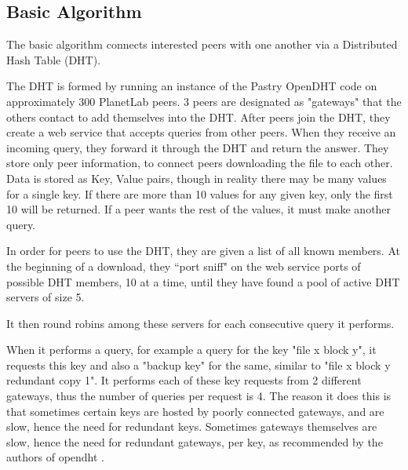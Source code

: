\subsection{Basic Algorithm}

The basic algorithm connects interested peers with one another via a Distributed Hash Table (DHT).

The DHT is formed by running an instance of the Pastry OpenDHT code on approximately 300 PlanetLab peers.  3 peers are designated as "gateways" that the others
contact to add themselves into the DHT.  After peers join the DHT, they create a web service that accepts queries from other peers.  When they receive an
incoming query, they forward it through the DHT and return the answer. They store only peer information, to connect peers downloading the file to each other.
Data is stored as Key, Value pairs, though in reality there may be many values for a single key.  If there are more than 10 values for any given
key, only the first 10 will be returned. If a peer wants the rest of the values, it must make another query.

In order for peers to use the DHT, they are given a list of all known members.  At the beginning of a download, they ``port sniff" on the web service ports of
possible DHT members, 10 at a time, until they have found a pool of active DHT servers  of size 5.

It then round robins among these servers for each consecutive query it performs.

When it performs a query, for example a query for the key "file x block y", it requests this key and also a "backup key" for the same, similar to "file x block y redundant copy 1".  It performs
each of these key requests from 2 different gateways, thus the number of queries per request is 4.  The reason it does this is that sometimes certain keys are hosted by poorly connected gateways,
and are slow, hence the need for redundant keys.  Sometimes gateways themselves are slow, hence the need for redundant gateways, per key, as recommended by the authors of opendht \cite{opendht_speed}.


